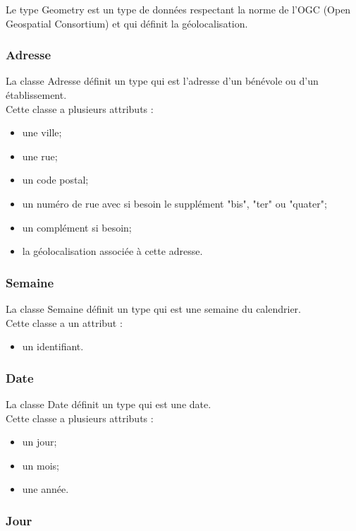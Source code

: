 Le type Geometry est un type de données respectant la norme de l'OGC (Open Geospatial Consortium) et qui définit la géolocalisation.

\subsubsection*{Adresse}

La classe Adresse définit un type qui est l'adresse d'un bénévole ou d'un établissement.\\
Cette classe a plusieurs attributs : 
\begin{itemize}
\item une ville;
\item une rue;
\item un code postal;
\item un numéro de rue avec si besoin le supplément "bis", "ter" ou "quater";
\item un complément si besoin;
\item la géolocalisation associée à cette adresse.
\end{itemize}

\subsubsection*{Semaine}

La classe Semaine définit un type qui est une semaine du calendrier.\\
Cette classe a un attribut : 
\begin{itemize}
\item un identifiant.
\end{itemize}

\subsubsection*{Date}

La classe Date définit un type qui est une date.\\
Cette classe a plusieurs attributs : 
\begin{itemize}
\item un jour;
\item un mois;
\item une année.
\end{itemize}

\subsubsection*{Jour}

